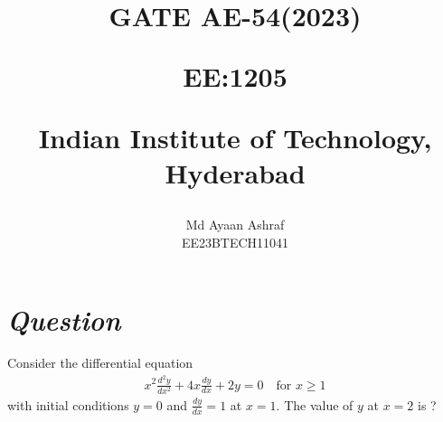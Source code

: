 \documentclass[journal,12pt,twocolumn]{IEEEtran}
\theoremstyle{remark}
\begin{document}
%




\vspace{3cm}

\title{
GATE AE-54(2023)

\large{EE:1205 }

Indian Institute of Technology, Hyderabad
}
\author{Md Ayaan Ashraf

EE23BTECH11041
}  
\maketitle
\newpage
\bigskip
\renewcommand{\thefigure}{\arabic{figure}}
\renewcommand{\thetable}{\arabic{table}}
\section*{\textit{\textbf{Question}}}
Consider the differential equation
\begin{align}
x^2\frac{d^2y}{dx^2} + 4x\frac{dy}{dx} + 2y = 0 \quad \text{for } x\geq 1 \nonumber
\end{align}
with initial conditions $y=0$ and $\frac{dy}{dx} = 1$ at
$x = 1$. The value of $y$ at $x = 2$ is ?
\end{document}
